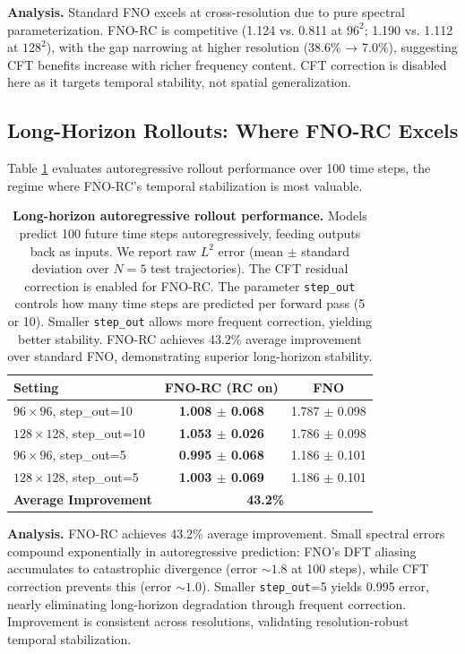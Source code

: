 \documentclass[11pt]{article}
\begin{document}
\textbf{Analysis.} Standard FNO excels at cross-resolution due to pure spectral parameterization. FNO-RC is competitive (1.124 vs. 0.811 at $96^2$; 1.190 vs. 1.112 at $128^2$), with the gap narrowing at higher resolution (38.6\% → 7.0\%), suggesting CFT benefits increase with richer frequency content. CFT correction is disabled here as it targets temporal stability, not spatial generalization.

\subsection{Long-Horizon Rollouts: Where FNO-RC Excels}

Table \ref{tab:rollout} evaluates autoregressive rollout performance over 100 time steps, the regime where FNO-RC's temporal stabilization is most valuable.

\begin{table}[h]
\centering
\caption{\textbf{Long-horizon autoregressive rollout performance.} Models predict 100 future time steps autoregressively, feeding outputs back as inputs. We report raw $L^2$ error (mean $\pm$ standard deviation over $N=5$ test trajectories). The CFT residual correction is enabled for FNO-RC. The parameter \texttt{step\_out} controls how many time steps are predicted per forward pass (5 or 10). Smaller \texttt{step\_out} allows more frequent correction, yielding better stability. FNO-RC achieves 43.2\% average improvement over standard FNO, demonstrating superior long-horizon stability.}
\label{tab:rollout}
\small
\begin{tabular}{@{}lcc@{}}
\toprule
\textbf{Setting} & \textbf{FNO-RC (RC on)} & \textbf{FNO} \\
\midrule
$96 \times 96$, step\_out=10 & \textbf{1.008 $\pm$ 0.068} & 1.787 $\pm$ 0.098 \\
$128 \times 128$, step\_out=10 & \textbf{1.053 $\pm$ 0.026} & 1.786 $\pm$ 0.098 \\
$96 \times 96$, step\_out=5 & \textbf{0.995 $\pm$ 0.068} & 1.186 $\pm$ 0.101 \\
$128 \times 128$, step\_out=5 & \textbf{1.003 $\pm$ 0.069} & 1.186 $\pm$ 0.101 \\
\midrule
\textbf{Average Improvement} & \multicolumn{2}{c}{\textbf{43.2\%}} \\
\bottomrule
\end{tabular}
\end{table}

\textbf{Analysis.} FNO-RC achieves 43.2\% average improvement. Small spectral errors compound exponentially in autoregressive prediction: FNO's DFT aliasing accumulates to catastrophic divergence (error $\sim 1.8$ at 100 steps), while CFT correction prevents this (error $\sim 1.0$). Smaller \texttt{step\_out}=5 yields 0.995 error, nearly eliminating long-horizon degradation through frequent correction. Improvement is consistent across resolutions, validating resolution-robust temporal stabilization.
\end{document}
